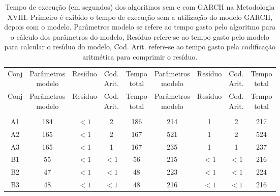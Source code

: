 \clearpage

\begin{center}
\begin{longtable}{ccccc|cccc}
\toprule
\rowcolor{white}
\caption[Metodologia XVIII: tempo de execução]{Tempo de execução (em segundos)
dos algoritmos sem e com GARCH na Metodologia XVIII. Primeiro é exibido o tempo de
execução sem a utilização do modelo GARCH, depois com o modelo. Parâmetros
modelo se refere ao tempo gasto pelo algoritmo para o cálculo dos parâmetros do
modelo, Resíduo refere-se ao tempo gasto pelo modelo para calcular o resíduo do
modelo, Cod. Arit. refere-se ao tempo gasto pela codificação aritmética para
comprimir o resíduo.} \label{tab:EvolucaoEntropiaMet18}\\
\midrule
Conj & \specialcell{Parâmetros\\modelo} &
Resíduo & \specialcell{Cod.\\Arit.} & \specialcell{Tempo\\total} &
\specialcell{Parâmetros\\modelo} &
Resíduo & \specialcell{Cod.\\Arit.} & \specialcell{Tempo\\total} \\
\midrule
\endfirsthead 
\midrule
\rowcolor{white}
Conj & \specialcell{Parâmetros\\modelo} &
Resíduo & \specialcell{Cod.\\Arit.} & \specialcell{Tempo\\total} &
\specialcell{Parâmetros\\modelo} &
Resíduo & \specialcell{Cod.\\Arit.} & \specialcell{Tempo\\total} \\
\toprule
\endhead
\midrule \\ %
\endfoot
\bottomrule 
\endlastfoot
A1&184&$<1$&2&186&214&1&2&217\\
A2&165&$<1$&2&167&521&1&2&524\\
A3&165&$<1$&1&167&235&1&1&237\\
B1&55&$<1$&$<1$&56&215&$<1$&$<1$&216\\
B2&47&$<1$&$<1$&48&223&$<1$&$<1$&224\\
B3&48&$<1$&$<1$&48&216&$<1$&$<1$&216\\

\end{longtable}
\end{center}
